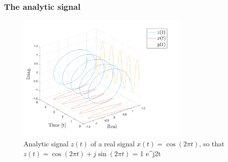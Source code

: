 \begin{frame}
    \frametitle{The analytic signal}
    \small
    
    \begin{figure}
        \centering
        \includegraphics[width=0.75\textwidth]{images/analytic-signal.png}
        \caption{Analytic signal $z(t)$ of a real signal $x(t)=\cos(2\pi t)$, so that $z(t)=\cos(2\pi t) + j\sin(2\pi t)$ = 1 e^{j2\pi t}}
        \label{fig:spectrum}
    \end{figure}
   
\end{frame}
